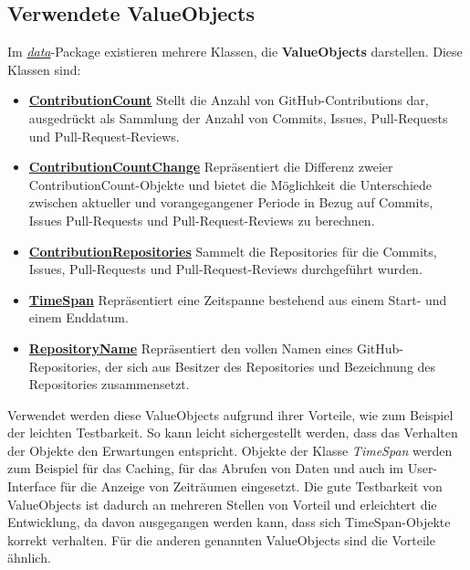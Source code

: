 \subsection{Verwendete ValueObjects}
Im \textit{\href{https://github.com/lukaspanni/OpenSourceStats/tree/main/app/src/main/java/de/lukaspanni/opensourcestats/data}{data}}-Package existieren mehrere Klassen, die \textbf{ValueObjects} darstellen.
\newline
Diese Klassen sind:
\begin{itemize}
\item{\textbf{\href{https://github.com/lukaspanni/OpenSourceStats/blob/main/app/src/main/java/de/lukaspanni/opensourcestats/data/ContributionCount.java}{ContributionCount}}}
\newline
Stellt die Anzahl von GitHub-Contributions dar, ausgedrückt als Sammlung der Anzahl von Commits, Issues, Pull-Requests und Pull-Request-Reviews.
\item{\textbf{\href{https://github.com/lukaspanni/OpenSourceStats/blob/main/app/src/main/java/de/lukaspanni/opensourcestats/data/ContributionCountChange.java}{ContributionCountChange}}}
\newline
Repräsentiert die Differenz zweier ContributionCount-Objekte und bietet die Möglichkeit die Unterschiede zwischen aktueller und vorangegangener Periode in Bezug auf Commits, Issues Pull-Requests und Pull-Request-Reviews zu berechnen. 
\item{\textbf{\href{https://github.com/lukaspanni/OpenSourceStats/blob/main/app/src/main/java/de/lukaspanni/opensourcestats/data/ContributionRepositories.java}{ContributionRepositories}}}
\newline
Sammelt die Repositories für die Commits, Issues, Pull-Requests und Pull-Request-Reviews durchgeführt wurden.
\item{\textbf{\href{https://github.com/lukaspanni/OpenSourceStats/blob/main/app/src/main/java/de/lukaspanni/opensourcestats/data/TimeSpan.java}{TimeSpan}}}
\newline
Repräsentiert eine Zeitspanne bestehend aus einem Start- und einem Enddatum.
\item{\textbf{\href{https://github.com/lukaspanni/OpenSourceStats/blob/main/app/src/main/java/de/lukaspanni/opensourcestats/data/RepositoryName.java}{RepositoryName}}}
\newline
Repräsentiert den vollen Namen eines GitHub-Repositories, der sich aus Besitzer des Repositories und Bezeichnung des Repositories zusammensetzt.
\end{itemize}
Verwendet werden diese ValueObjects aufgrund ihrer Vorteile, wie zum Beispiel der leichten Testbarkeit.
So kann leicht sichergestellt werden, dass das Verhalten der Objekte den Erwartungen entspricht.
\newline
Objekte der Klasse \textit{TimeSpan} werden zum Beispiel für das Caching, für das Abrufen von Daten und auch im User-Interface für die Anzeige von Zeiträumen eingesetzt.
Die gute Testbarkeit von ValueObjects ist dadurch an mehreren Stellen von Vorteil und erleichtert die Entwicklung, da davon ausgegangen werden kann, dass sich TimeSpan-Objekte korrekt verhalten.
Für die anderen genannten ValueObjects sind die Vorteile ähnlich.



